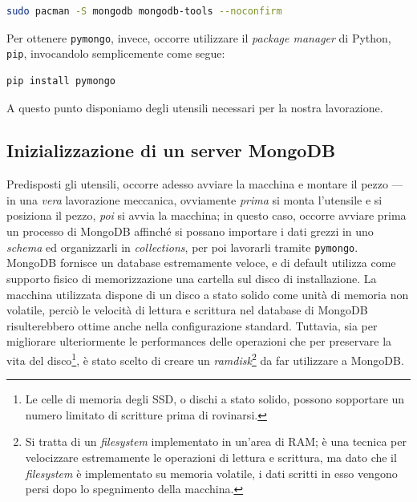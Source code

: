 		\begin{lstlisting}[language=bash,caption={installazione di MongoDB}]
			sudo pacman -S mongodb mongodb-tools --noconfirm
		\end{lstlisting}

		\vspace{0.3cm}

		Per ottenere \texttt{pymongo}, invece, occorre utilizzare il \textit{package manager} di Python, \texttt{pip}, invocandolo semplicemente come segue:

		\begin{lstlisting}[language=bash,caption={installazione di pymongo}]
			pip install pymongo
		\end{lstlisting}

		\vspace{0.3cm}

		A questo punto disponiamo degli utensili necessari per la nostra lavorazione.

	\subsection{Inizializzazione di un server MongoDB}

		Predisposti gli utensili, occorre adesso avviare la macchina e montare il pezzo --- in una \textit{vera} lavorazione meccanica, ovviamente \textit{prima} si monta l'utensile e si posiziona il pezzo, \textit{poi} si avvia la macchina; in questo caso, occorre avviare prima un processo di MongoDB affinché si possano importare i dati grezzi in uno \textit{schema} ed organizzarli in \textit{collections}, per poi lavorarli tramite \texttt{pymongo}. \\

		MongoDB fornisce un database estremamente veloce, e di default utilizza come supporto fisico di memorizzazione una cartella sul disco di installazione. La macchina utilizzata dispone di un disco a stato solido come unità di memoria non volatile, perciò le velocità di lettura e scrittura nel database di MongoDB risulterebbero ottime anche nella configurazione standard. Tuttavia, sia per migliorare ulteriormente le performances delle operazioni che per preservare la vita del disco\footnote{Le celle di memoria degli SSD, o dischi a stato solido, possono sopportare un numero limitato di scritture prima di rovinarsi.}, è stato scelto di creare un \textit{ramdisk}\footnote{Si tratta di un \textit{filesystem} implementato in un'area di RAM; è una tecnica per velocizzare estremamente le operazioni di lettura e scrittura, ma dato che il \textit{filesystem} è implementato su memoria volatile, i dati scritti in esso vengono persi dopo lo spegnimento della macchina.} da far utilizzare a MongoDB. \\

